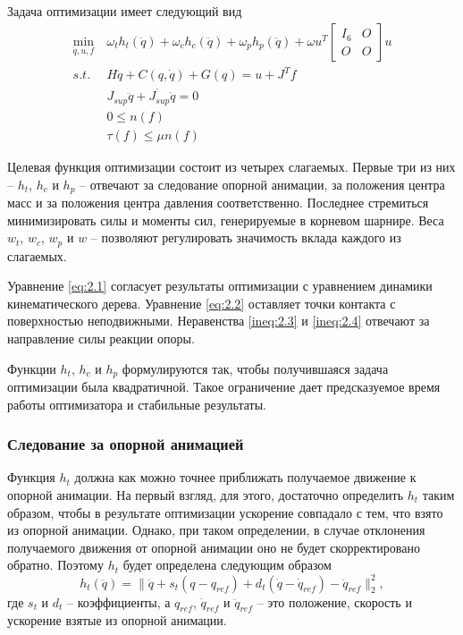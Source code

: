 Задача оптимизации имеет следующий вид
\begin{align*}
  \min_{\ddot{q}, u, f} &\ \omega_{t} h_{t}(\ddot{q}) + \omega_{c} h_{c}(\ddot{q}) + \omega_{p} h_{p}(\ddot{q}) + \omega u^{T} \begin{bmatrix} I_{6} & O \\ O & O \end{bmatrix} u \\
  s.t. &\ H \ddot{q} + C(q, \dot{q}) + G(q) = u + J^{T} f \tag{2.1}\label{eq:2.1} \\
       &\ J_{sup} \ddot{q} + \dot{J_{sup}} \dot{q} = 0 \tag{2.2}\label{eq:2.2} \\
       &\ 0 \le n(f) \tag{2.3}\label{ineq:2.3} \\
       &\ \tau(f) \le \mu n(f) \tag{2.4}\label{ineq:2.4}
\end{align*}

Целевая функция оптимизации состоит из четырех слагаемых. Первые три из них -- $h_{t}$, $h_{c}$ и $h_{p}$ -- отвечают за следование опорной анимации, за положения центра масс и за положения центра давления соответственно. Последнее стремиться минимизировать силы и моменты сил, генерируемые в корневом шарнире. Веса $w_{t}$, $w_{c}$, $w_{p}$ и $w$ -- позволяют регулировать значимость вклада каждого из слагаемых.

Уравнение \ref{eq:2.1} согласует результаты оптимизации с уравнением динамики кинематического дерева. Уравнение \ref{eq:2.2} оставляет точки контакта с поверхностью неподвижными. Неравенства \ref{ineq:2.3} и \ref{ineq:2.4} отвечают за направление силы реакции опоры.

Функции $h_{t}$, $h_{c}$ и $h_{p}$ формулируются так, чтобы получившаяся задача оптимизации была квадратичной. Такое ограничение дает предсказуемое время работы оптимизатора и стабильные результаты.

\subsubsection{Следование за опорной анимацией}

Функция $h_{t}$ должна как можно точнее приближать получаемое движение к опорной анимации. На первый взгляд, для этого, достаточно определить $h_{t}$ таким образом, чтобы в результате оптимизации ускорение совпадало с тем, что взято из опорной анимации. Однако, при таком определении, в случае отклонения получаемого движения от опорной анимации оно не будет скорректировано обратно. Поэтому $h_{t}$ будет определена следующим образом
\begin{equation*}
  h_{t}(\ddot{q}) = \lVert \ddot{q} + s_{t} (q - q_{ref}) + d_{t} (\dot{q} - \dot{q}_{ref}) - \ddot{q}_{ref} \rVert_{2}^{2},
\end{equation*}
где $s_{t}$ и $d_{t}$ -- коэффициенты, а $q_{ref}$, $\dot{q}_{ref}$ и $\ddot{q}_{ref}$ -- это положение, скорость и ускорение взятые из опорной анимации.

